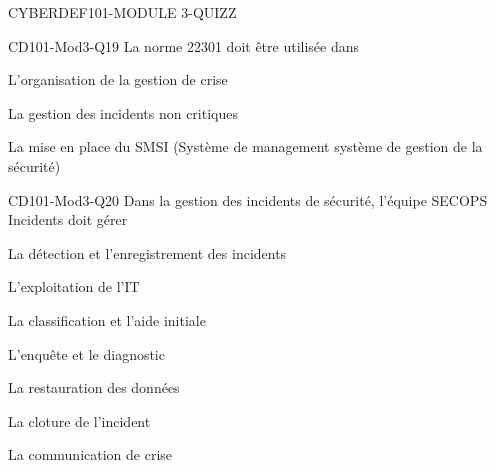\documentclass[12pt]{article}
\begin{document}
\begin{quiz}{CYBERDEF101-MODULE 3-QUIZZ}
\begin{multi}[multiple=true]{CD101-Mod3-Q19}
La norme 22301 doit être utilisée dans
\item* L’organisation de la gestion de crise
\item La gestion des incidents non critiques
\item La mise en place du SMSI (Système de management système de gestion de la sécurité)
\end{multi}

\begin{multi}[multiple=true]{CD101-Mod3-Q20}
 Dans la gestion des incidents de sécurité, l'équipe SECOPS Incidents doit gérer
\item* La détection et l’enregistrement des incidents
\item L'exploitation de l’IT
\item* La classification et l’aide initiale
\item* L’enquête et le diagnostic
\item La restauration des données
\item* La cloture de l’incident
\item La communication de crise
\end{multi}

 \end{quiz}
 
 
\end{document}
